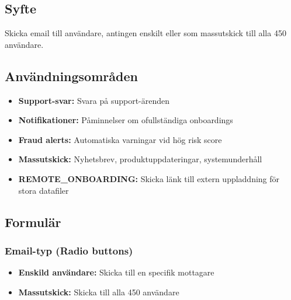 \documentclass[12pt,a4paper]{article}
\begin{document}
\subsection{Syfte}
Skicka email till användare, antingen enskilt eller som massutskick till alla 450 användare.

\subsection{Användningsområden}
\begin{itemize}
  \item \textbf{Support-svar:} Svara på support-ärenden
  \item \textbf{Notifikationer:} Påminnelser om ofullständiga onboardings
  \item \textbf{Fraud alerts:} Automatiska varningar vid hög risk score
  \item \textbf{Massutskick:} Nyhetsbrev, produktuppdateringar, systemunderhåll
  \item \textbf{REMOTE\_ONBOARDING:} Skicka länk till extern uppladdning för stora datafiler
\end{itemize}

\subsection{Formulär}

\subsubsection{Email-typ (Radio buttons)}
\begin{itemize}
  \item \textbf{Enskild användare:} Skicka till en specifik mottagare
  \item \textbf{Massutskick:} Skicka till alla 450 användare
\end{itemize}
\end{document}
